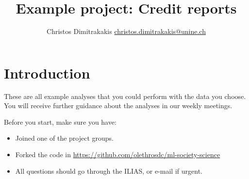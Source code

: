 \documentclass[a4paper,twoside]{article}
\title{Example project: Credit reports}
\author{Christos Dimitrakakis \url{christos.dimitrakakis@unine.ch}}
\begin{document}
\maketitle
\section{Introduction}

These are all example analyses that you could perform with the data you choose. You will receive further guidance about the analyses in our weekly meetings.

Before you start, make sure you have:
\begin{itemize}
\item Joined one of the project groups.
\item Forked the code in \url{https://github.com/olethrosdc/ml-society-science}
\item All questions should go through the ILIAS, or e-mail if urgent.
\end{itemize}


%
%
\end{document}
